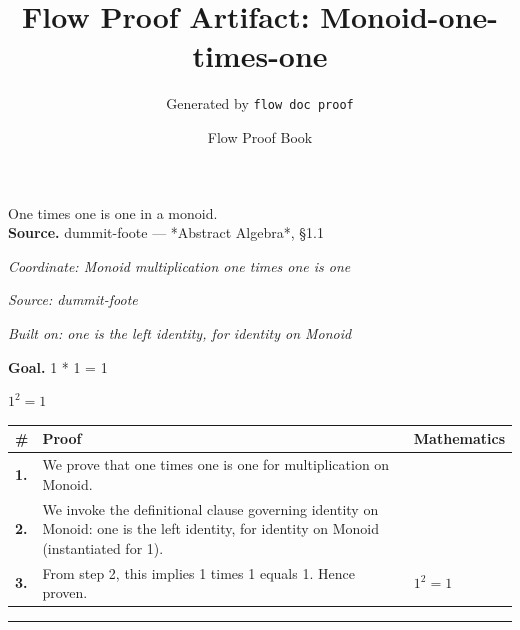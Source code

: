 \documentclass[11pt]{article}
\title{Flow Proof Artifact: Monoid-one-times-one}
\author{Generated by \texttt{flow doc proof}}
\date{Flow Proof Book}
\theoremstyle{definition}
\begin{document}
\maketitle
One times one is one in a monoid.\\[0.5em]
\textbf{Source.} dummit-foote — *Abstract Algebra*, §1.1\\[0.5em]
\bigskip
{}\par
\smallskip\noindent\textit{Coordinate: Monoid \cdot multiplication \cdot one times one is one}\par
\smallskip\noindent\textit{Source: dummit-foote}\par
\smallskip\noindent\textit{Built on: one is the left identity, for identity on Monoid}\par
\medskip
\noindent\textbf{Goal.} 1 * 1 = 1\par
\noindent$\displaystyle 1^{2} = 1$\par
\medskip
\noindent
\begin{tabular}{@{} >{\raggedright\arraybackslash}p{} >{\raggedright\arraybackslash}p{} >{\raggedleft\arraybackslash}p{} @{}}
\textbf{\#} & \textbf{Proof} & \textbf{Mathematics} \\
\midrule
\textbf{1.} & We prove that one times one is one for multiplication on Monoid. & \\[0.45em]
\textbf{2.} & We invoke the definitional clause governing identity on Monoid: one is the left identity, for identity on Monoid (instantiated for 1). & \\[0.45em]
\textbf{3.} & From step 2, this implies 1 times 1 equals 1. Hence proven. & $\displaystyle 1^{2} = 1$ \\[0.45em]
\bottomrule
\end{tabular}
\label{thm:Monoid-multiplication-one_times_one_is_one}
\par\medskip\hrule
\end{document}
